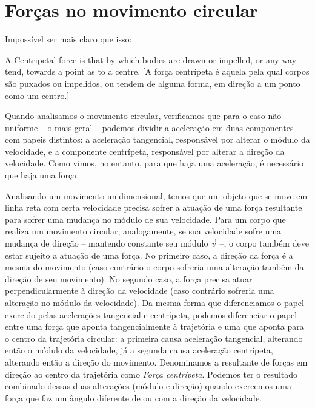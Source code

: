 \section{Forças no movimento circular}
Impossível ser mais claro que isso:

A Centripetal force is that by which bodies are drawn or impelled, or any way tend, towards a point as to a centre.
[A força centrípeta é aquela pela qual corpos são puxados ou impelidos, ou tendem de alguma forma, em direção a um ponto como um centro.]

Quando analisamos o movimento circular, verificamos que para o caso não uniforme -- o mais geral -- podemos dividir a aceleração em duas componentes com papeis distintos: a aceleração tangencial, responsável por alterar o módulo da velocidade, e a componente centrípeta, responsável por alterar a direção da velocidade. Como vimos, no entanto, para que haja uma aceleração, é necessário que haja uma força. 

Analisando um movimento unidimensional, temos que um objeto que se move em linha reta com certa velocidade precisa sofrer a atuação de uma força resultante para sofrer uma mudança no módulo de sua velocidade. Para um corpo que realiza um movimento circular, analogamente, se sua velocidade sofre uma mudança de direção -- mantendo constante seu módulo $\vec{v}$ --, o corpo também deve estar sujeito a atuação de uma força. No primeiro caso, a direção da força é a mesma do movimento (caso contrário o corpo sofreria uma alteração também da direção de seu movimento). No segundo caso, a força precisa atuar perpendicularmente à direção da velocidade (caso contrário sofreria uma alteração no módulo da velocidade). Da mesma forma que diferenciamos o papel exercido pelas acelerações tangencial e centrípeta, podemos diferenciar o papel entre uma força que aponta tangencialmente à trajetória e uma que aponta para o centro da trajetória circular: a primeira causa aceleração tangencial, alterando então o módulo da velocidade, já a segunda causa aceleração centrípeta, alterando então a direção do movimento. Denominamos a resultante de forças em direção ao centro da trajetória como \emph{Força centrípeta}. Podemos ter o resultado combinado dessas duas alterações (módulo e direção) quando exercemos uma força que faz um ângulo diferente de  ou  com a direção da velocidade.

